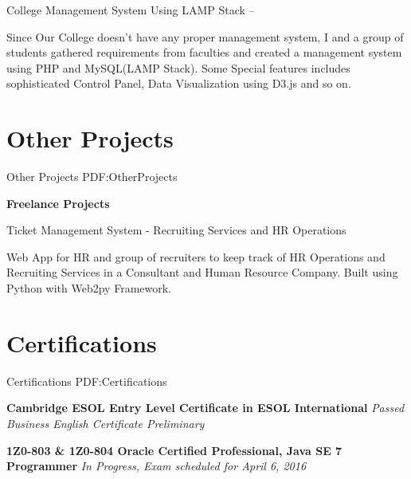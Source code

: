 \documentclass[letterpaper,MMMyyyy,nonstop]{simpleresumecv}
\begin{document}
\begin{body}
\newline

\GapNoBreak
\BulletItem
College Management System Using LAMP Stack
\hfill
{} --
\begin{detail}
\SubBulletItem
Since Our College doesn't have any proper management system, I and a group of students gathered requirements from faculties and created a management system using PHP and MySQL(LAMP Stack). Some Special features includes sophisticated Control Panel, Data Visualization using D3.js and so on. 
\end{detail}


\section
{Other Projects}
{Other Projects}
{PDF:OtherProjects}

{\textbf{Freelance Projects}}

\GapNoBreak
\BulletItem
Ticket Management System - Recruiting Services and HR Operations
\begin{detail}
\SubBulletItem
Web App for HR and group of recruiters to keep track of HR Operations and Recruiting Services in a Consultant and Human Resource Company.
Built using Python with Web2py Framework.
\end{detail}


\section
{Certifications}
{Certifications}
{PDF:Certifications}


\BulletItem
\textbf{Cambridge ESOL Entry Level Certificate in ESOL International }
\newline
\emph {Passed Business English Certificate Preliminary}

\GapNoBreak
\newline

\BulletItem
\textbf{1Z0-803 \& 1Z0-804 Oracle Certified Professional, Java SE 7 Programmer }
\newline
\emph {In Progress, Exam scheduled for April 6, 2016}




\end{body}
\end{document}

